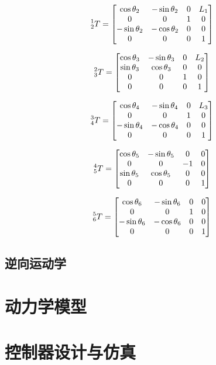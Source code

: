 \documentclass{ctexart}
\begin{document}
\[
    \prescript{1}{2}{T} =
    \begin{bmatrix}
        \cos \theta_2 & - \sin \theta_2 & 0 & L_1 \\
        0 & 0 & 1 & 0 \\
        -\sin \theta_2 & - \cos \theta_2 & 0 & 0 \\
        0 & 0 & 0 & 1
    \end{bmatrix}
\]

\[
    \prescript{2}{3}{T} = 
    \begin{bmatrix}
        \cos \theta_3 & - \sin \theta_3 & 0 & L_2 \\
        \sin \theta_3 & \cos \theta_3 & 0 & 0 \\
        0 & 0 & 1 & 0 \\
        0 & 0 & 0 & 1
    \end{bmatrix}
\]

\[
    \prescript{3}{4}{T} =
    \begin{bmatrix}
        \cos \theta_4 & - \sin \theta_4 & 0 & L_3 \\
        0 & 0 & 1 & 0 \\
        -\sin \theta_4 & - \cos \theta_4 & 0 & 0 \\
        0 & 0 & 0 & 1
    \end{bmatrix}
\]

\[
    \prescript{4}{5}{T} =
    \begin{bmatrix}
        \cos \theta_5 & - \sin \theta_5 & 0 & 0 \\
        0 & 0 & -1 & 0 \\
        \sin \theta_5 & \cos \theta_5 & 0 & 0 \\
        0 & 0 & 0 & 1
    \end{bmatrix}
\]

\[
    \prescript{5}{6}{T} =
    \begin{bmatrix}
        \cos \theta_6 & - \sin \theta_6 & 0 & 0 \\
        0 & 0 & 1 & 0 \\
        -\sin \theta_6 & - \cos \theta_6 & 0 & 0 \\
        0 & 0 & 0 & 1
    \end{bmatrix}
\]


\subsection{逆向运动学}

\section{动力学模型}

\section{控制器设计与仿真}
\end{document}

